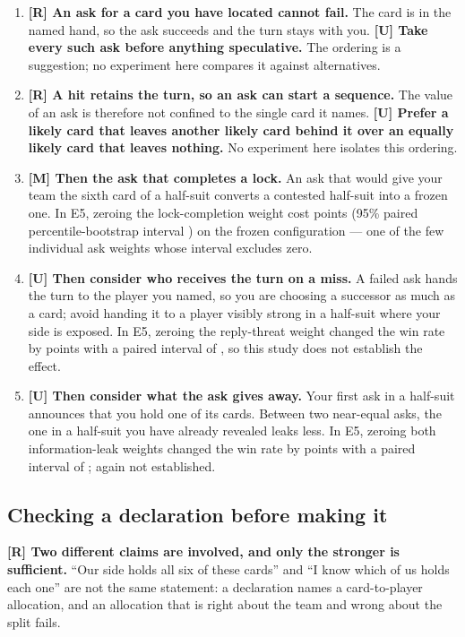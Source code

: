 \begin{enumerate}[leftmargin=2em]
\item \textbf{[R] An ask for a card you have located cannot fail.} The card is
in the named hand, so the ask succeeds and the turn stays with you.
\textbf{[U] Take every such ask before anything speculative.} The ordering is a
suggestion; no experiment here compares it against alternatives.
\item \textbf{[R] A hit retains the turn, so an ask can start a sequence.} The
value of an ask is therefore not confined to the single card it names.
\textbf{[U] Prefer a likely card that leaves another likely card behind it over
an equally likely card that leaves nothing.} No experiment here isolates this
ordering.
\item \textbf{[M] Then the ask that completes a lock.} An ask that would give
your team the sixth card of a half-suit converts a contested half-suit into a
frozen one. In E5, zeroing the lock-completion weight cost \numAblLockWeight{}
points (95\% paired percentile-bootstrap interval \numAblLockWeightCI{}) on the
frozen configuration --- one of the few individual ask weights whose interval
excludes zero.
\item \textbf{[U] Then consider who receives the turn on a miss.} A failed ask
hands the turn to the player you named, so you are choosing a successor as much
as a card; avoid handing it to a player visibly strong in a half-suit where your
side is exposed. In E5, zeroing the reply-threat weight changed the win rate by
\numAblThreat{} points with a paired interval of \numAblThreatCI{}, so this
study does not establish the effect.
\item \textbf{[U] Then consider what the ask gives away.} Your first ask in a
half-suit announces that you hold one of its cards. Between two near-equal asks,
the one in a half-suit you have already revealed leaks less. In E5, zeroing both
information-leak weights changed the win rate by \numAblLeak{} points with a
paired interval of \numAblLeakCI{}; again not established.
\end{enumerate}

\subsection{Checking a declaration before making it}
\label{app:human-declare}

\textbf{[R] Two different claims are involved, and only the stronger is
sufficient.} ``Our side holds all six of these cards'' and ``I know which of us
holds each one'' are not the same statement: a declaration names a
card-to-player allocation, and an allocation that is right about the team and
wrong about the split fails.

